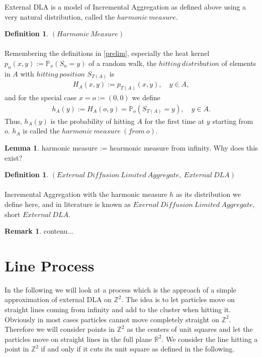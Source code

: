 \documentclass[12pt,a4paper]{scrartcl}
\numberwithin{equation}{section}
\numberwithin{equation}{section}%
\theoremstyle{definition}
\newtheorem{lemma}[theorem]{Lemma}
\newtheorem{definition}[theorem]{Definition}
\theoremstyle{definition}
\newtheorem{rem}[thm]{Remark}%
\begin{document}
External DLA is a model of Incremental Aggregation as defined above using a very natural distribution, called the $\mathit{harmonic\ measure}$. 

\begin{definition} $\mathit{(Harmonic\ Measure)}$\\
	\\
	Remembering the definitions in \eqref{prelim}, especially the heat kernel $p_n(x,y):=\mathbb{P}_x(S_n=y)$ of a random walk, the $\mathit{hitting\ distribution}$ of elements in $A$ with $\mathit{hitting\ position}$ $S_{T(A)}$ is 
	\begin{align*}
	H_A(x,y) := p_{T(A)}(x,y),\quad y\in A, 
	\end{align*}
	and for the special case $x=o:=(0,0)$ we define
	\begin{align*}
	h_A(y) := H_A(o,y) = \mathbb{P}_o(S_{T(A)}=y),\quad y\in A.
	\end{align*}
	Thus, $h_A(y)$ is the probability of hitting $A$ for the first time at $y$ starting from $o$. $h_A$ is called the $\mathit{harmonic\ measure\ (from\ o)}$.
\end{definition}

\begin{lemma}
	harmonic measure := hearmonic measure from infinity. Why does this exist?
\end{lemma}

\begin{definition} $\mathit{(External\ Diffusion\ Limited\ Aggregate,\ External\ DLA)}$\\
	\\ Incremental Aggregation with the harmonic measure $h$ as its distribution we define here, and in literature is known as $\mathit{Exernal\ Diffusion\ Limited\ Aggregate}$, short $\mathit{External\ DLA}$.
\end{definition}

\begin{rem}
	contenu...
\end{rem}


\newpage


\section{Line Process}

In the following we will look at a process which is the approach of a simple approximation of external DLA on $\mathbb{Z}^2$. The idea is to let particles move on straight lines coming from infinity and add to the cluster when hitting it. Obviously in most cases particles cannot move completely straight on $\mathbb{Z}^2$. Therefore we will consider points in $\mathbb{Z}^2$ as the centers of unit squares and let the particles move on straight lines in the full plane $\mathbb{R}^2$. We consider the line hitting a point in $\mathbb{Z}^2$ if and only if it cuts its unit square as defined in the following. 
\end{document}

